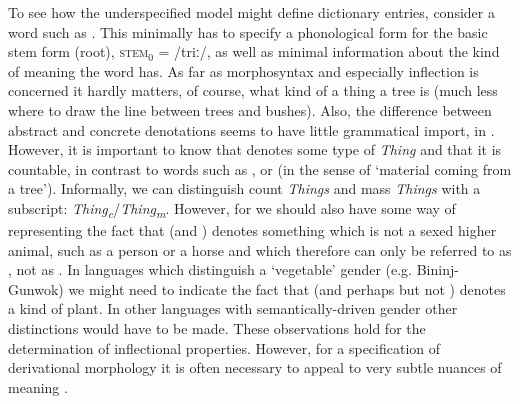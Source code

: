 \documentclass[output=paper]{langsci/langscibook}
\begin{document}
To see how the underspecified  model might define dictionary entries, consider a word such as . This minimally has to specify a phonological form for the basic stem form (root), \textsc{stem$_0$} = /triː/, as well as  minimal information about the kind of meaning the word has. As far as morphosyntax and especially inflection  is concerned it hardly matters, of course, what kind of a thing a tree is (much less where to draw the line between trees and bushes). Also, the difference between abstract and concrete denotations seems to have little grammatical import, in . However,  it is important to know that  denotes some type of \textit{Thing} and that it is countable, in contrast to words such as , or  (in the sense of `material coming from a tree'). Informally, we can distinguish count \textit{Things} and mass \textit{Things} with a subscript: \textit{Thing\textsubscript{c}}/\textit{Thing\textsubscript{m}}. However, for  we should also have some way of representing the fact that  (and ) denotes something which is not a sexed higher animal, such as a person or a horse and which therefore can only be referred to as , not as . In languages which distinguish a `vegetable' gender (e.g. Bininj-Gunwok) we might need to indicate the fact that  (and perhaps  but not ) denotes a kind of plant. In other languages with semantically-driven gender other distinctions would have to be made. These observations hold for the determination of inflectional properties. However, for a specification of derivational morphology it is often necessary to appeal to very subtle nuances of meaning \citep{Fradin03b}.
\end{document}
